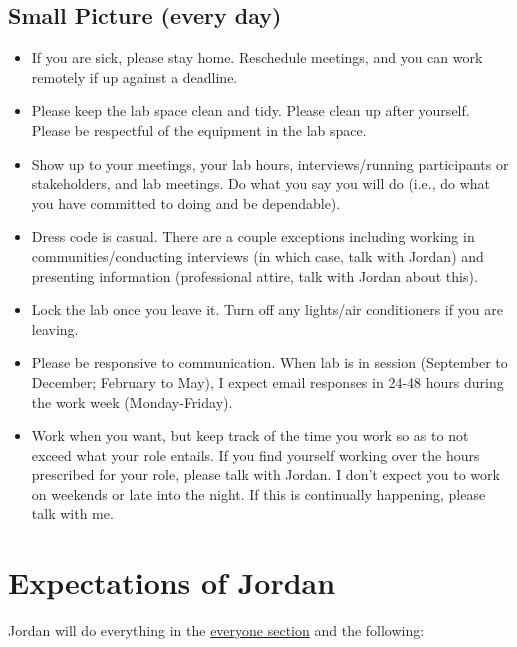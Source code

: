 \documentclass[
]{book}
\begin{document}
\hypertarget{small-picture-every-day}{%
\subsection{Small Picture (every day)}\label{small-picture-every-day}}

\begin{itemize}
\item
  If you are sick, please stay home. Reschedule meetings, and you can work remotely if up against a deadline.
\item
  Please keep the lab space clean and tidy. Please clean up after yourself. Please be respectful of the equipment in the lab space.
\item
  Show up to your meetings, your lab hours, interviews/running participants or stakeholders, and lab meetings. Do what you say you will do (i.e., do what you have committed to doing and be dependable).
\item
  Dress code is casual. There are a couple exceptions including working in communities/conducting interviews (in which case, talk with Jordan) and presenting information (professional attire, talk with Jordan about this).
\item
  Lock the lab once you leave it. Turn off any lights/air conditioners if you are leaving.
\item
  Please be responsive to communication. When lab is in session (September to December; February to May), I expect email responses in 24-48 hours during the work week (Monday-Friday).
\item
  Work when you want, but keep track of the time you work so as to not exceed what your role entails. If you find yourself working over the hours prescribed for your role, please talk with Jordan. I don't expect you to work on weekends or late into the night. If this is continually happening, please talk with me.
\end{itemize}

\hypertarget{expectations-of-jordan}{%
\section{Expectations of Jordan}\label{expectations-of-jordan}}

Jordan will do everything in the \protect\hyperlink{everyone}{everyone section} and the following:
\end{document}
